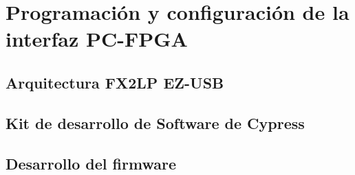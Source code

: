 \chapter{Programación y configuración de la interfaz PC-FPGA}
	
	\label{cap:cy}
	\section{Arquitectura FX2LP EZ-USB}
		
	\section{Kit de desarrollo de Software de Cypress}
		
	\section{Desarrollo del firmware}
		